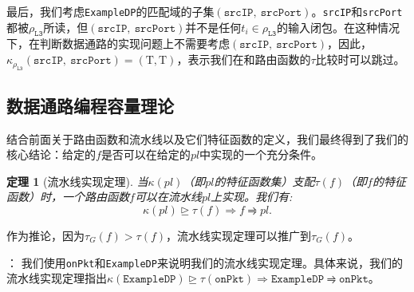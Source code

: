\documentclass{ctexart}
\newcommand{\exampledp}{\texttt{ExampleDP}}
\newcommand{\para}[1]{\smallskip\noindent {\bf #1}}
\newtheorem{theorem}{定理}
\begin{document}

最后，我们考虑\exampledp{}的匹配域的子集$(\texttt{srcIP},\ \texttt{srcPort})$。\texttt{srcIP}和\texttt{srcPort}都被$\rho_{\texttt{L3}}$所读，但$(\texttt{srcIP},\ \texttt{srcPort})$并不是任何$t_i \in \rho_{\texttt{L3}}$的输入闭包。在这种情况下，在判断数据通路的实现问题上不需要考虑$(\texttt{srcIP},\ \texttt{srcPort})$，因此，$\kappa_{\rho_{\texttt{L3}}}(\texttt{srcIP},\ \texttt{srcPort}) = (\mathrm{T}, \mathrm{T})$，表示我们在和路由函数的$\tau$比较时可以跳过。



\subsection{数据通路编程容量理论}
结合前面关于路由函数和流水线以及它们特征函数的定义，我们最终得到了我们的核心结论：给定的$f$是否可以在给定的$pl$中实现的一个充分条件。

\begin{theorem}[流水线实现定理] 当$\kappa(pl)$（即$pl$的特征函数集）支配$\tau(f)$（即$f$的特征函数）时，一个路由函数$f$可以在流水线$pl$上实现。我们有:
\begin{equation*}
\kappa(pl) \trianglerighteq \tau(f) \Rightarrow f \rightrightharpoons pl.
\end{equation*}
\end{theorem}

作为推论，因为$\tau_G(f) > \tau(f)$，流水线实现定理可以推广到$\tau_G(f)$。

\para{示例}： 我们使用\texttt{onPkt}和\exampledp 来说明我们的流水线实现定理。具体来说，我们的流水线实现定理指出$\kappa(\exampledp) \trianglerighteq \tau(\texttt{onPkt}) \Rightarrow \exampledp \rightrightharpoons \texttt{onPkt}$。
\end{document}
